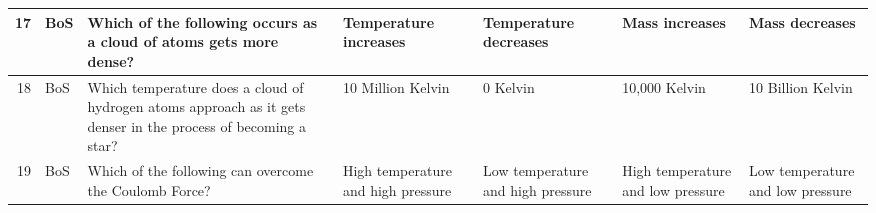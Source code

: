 \documentclass[10pt]{article}
\begin{document}
\begin{tiny}
\begin{longtable}{|r|p{0.375in}|p{1.275in}|p{0.75in}|p{0.75in}|p{0.75in}|p{0.75in}|}
    17    &     BoS &                                                                                                                                                                                                               Which of the following occurs as a cloud of atoms gets more dense? &                                                                                                                 Temperature increases &                                                                                 Temperature decreases &                                                                                                             Mass increases &                                                                                                                    Mass decreases \\\hline
    18    &     BoS &                                                                                                                                                                   Which temperature does a cloud of hydrogen atoms approach as it gets denser in the process of becoming a star? &                                                                                                                     10 Million Kelvin &                                                                                              0 Kelvin &                                                                                                              10,000 Kelvin &                                                                                                                 10 Billion Kelvin \\\hline
    19    &     BoS &                                                                                                                                                                                                                           Which of the following can overcome the Coulomb Force? &                                                                                                    High temperature and high pressure &                                                                     Low temperature and high pressure &                                                                                          High temperature and low pressure &                                                                                                  Low temperature and low pressure \\\hline

\end{longtable}
\end{tiny}
\end{document}
